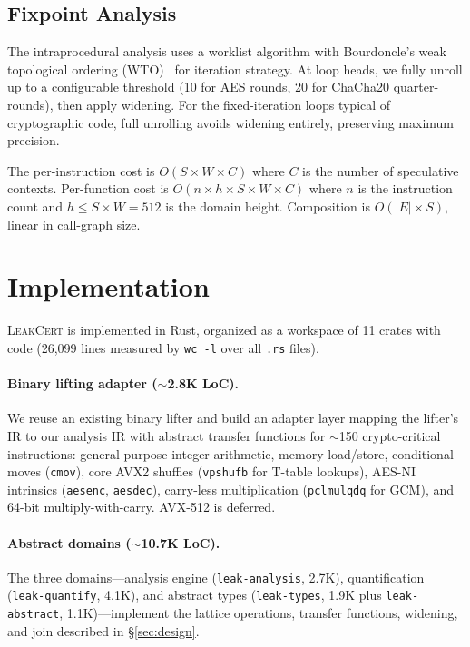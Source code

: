 \documentclass{article}
\theoremstyle{definition}
\theoremstyle{remark}
\begin{document}
\subsection{Fixpoint Analysis}
\label{sec:fixpoint}

The intraprocedural analysis uses a worklist algorithm with Bourdoncle's weak
topological ordering (WTO)~\cite{bourdoncle1993efficient} for iteration strategy.  At loop heads, we fully
unroll up to a configurable threshold (10 for AES rounds, 20 for ChaCha20
quarter-rounds), then apply widening.  For the fixed-iteration loops typical of
cryptographic code, full unrolling avoids widening entirely, preserving maximum
precision.

The per-instruction cost is $O(S \times W \times C)$ where $C$ is the number of
speculative contexts.  Per-function cost is $O(n \times h \times S \times W
\times C)$ where $n$ is the instruction count and $h \leq S \times W = 512$ is
the domain height.  Composition is $O(|E| \times S)$, linear in call-graph size.

\section{Implementation}
\label{sec:impl}

\textsc{LeakCert} is implemented in Rust, organized as a
workspace of 11 crates with code (26,099 lines measured by \texttt{wc -l}
over all \texttt{.rs} files).

\paragraph{Binary lifting adapter ($\sim$2.8K LoC).}
We reuse an existing binary lifter and build an adapter layer mapping the
lifter's IR to our analysis IR with abstract transfer functions for $\sim$150
crypto-critical instructions: general-purpose integer arithmetic, memory
load/store, conditional moves (\texttt{cmov}), core AVX2 shuffles
(\texttt{vpshufb} for T-table lookups), AES-NI intrinsics (\texttt{aesenc},
\texttt{aesdec}), carry-less multiplication (\texttt{pclmulqdq} for GCM), and
64-bit multiply-with-carry.  AVX-512 is deferred.

\paragraph{Abstract domains ($\sim$10.7K LoC).}
The three domains---analysis engine (\texttt{leak-analysis}, 2.7K),
quantification (\texttt{leak-quantify}, 4.1K),
and abstract types (\texttt{leak-types}, 1.9K plus \texttt{leak-abstract}, 1.1K)---implement
the lattice operations, transfer functions, widening, and
join described in \S\ref{sec:design}.
\end{document}
